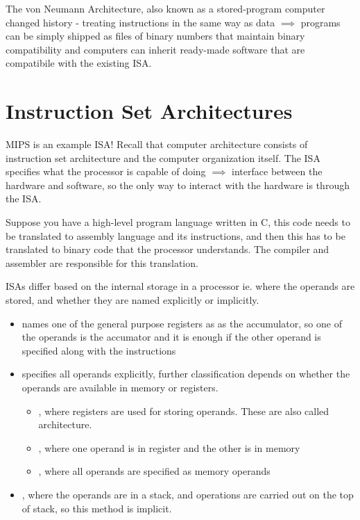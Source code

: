 \documentclass[12pt]{scrartcl}
\begin{document}
\begin{definition}
  The von Neumann Architecture, also known as a stored-program computer changed history - 
  treating instructions in the same way as data $\implies$ programs can be simply
  shipped as files of binary numbers that maintain binary compatibility and computers 
  can inherit ready-made software that are compatibile with the existing ISA. 
\end{definition}

\section{Instruction Set Architectures}

\begin{remark}
  MIPS is an example ISA! Recall that computer architecture consists of instruction 
  set architecture and the computer organization itself. The ISA specifies what the processor 
  is capable of doing $\implies$ interface between the hardware and software, so the only way 
  to interact with the hardware is through the ISA. 
\end{remark}

\begin{note}
  Suppose you have a high-level program language written in C, this code needs 
  to be translated to assembly language and its instructions, and then this has to be translated to 
  binary code that the processor understands. The compiler and assembler are responsible 
  for this translation. 
\end{note}

\begin{definition}
  ISAs differ based on the internal storage in a processor ie. where the operands are stored, and 
  whether they are named explicitly or implicitly. 
  \begin{itemize}
    \item {} names one of the general purpose registers as 
    as the accumulator, so one of the operands is the accumator and it is enough if the other operand 
    is specified along with the instructions
    \item {} specifies all operands explicitly, further classification 
    depends on whether the operands are available in memory or registers. 
    \begin{itemize}
      \item {}, where registers are used for storing operands. These are also called  architecture. 
      \item {}, where one operand is in register and the other is in memory
      \item {}, where all operands are specified as memory operands
    \end{itemize}
    \item {}, where the operands are in a stack, and operations 
    are carried out on the top of stack, so this method is implicit. 
  \end{itemize}
\end{definition}
\end{document}
